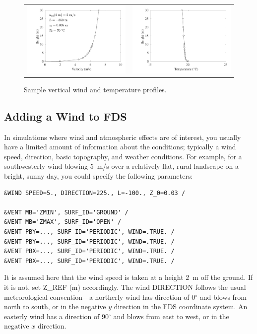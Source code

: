 \documentclass[11pt]{book}
\begin{document}
\begin{figure}[p]
\begin{tabular*}{\textwidth}{l@{\extracolsep{\fill}}r}
      \includegraphics[width=3.2in]{FIGURES/vel_L=-350}  &
      \includegraphics[width=3.2in]{FIGURES/tmp_L=-350}
   \end{tabular*}
   \caption[Sample vertical wind and temperature profiles]{Sample vertical wind and temperature profiles.}
   \label{wind_profiles}
\end{figure}


\subsection{Adding a Wind to FDS}


In simulations where wind and atmospheric effects are of interest, you usually have a limited amount of information about the conditions; typically a wind speed, direction, basic topography, and weather conditions. For example, for a southwesterly wind blowing 5~m/s over a relatively flat, rural landscape on a bright, sunny day, you could specify the following parameters:
\begin{lstlisting}
&WIND SPEED=5., DIRECTION=225., L=-100., Z_0=0.03 /

&VENT MB='ZMIN', SURF_ID='GROUND' /
&VENT MB='ZMAX', SURF_ID='OPEN' /
&VENT PBY=..., SURF_ID='PERIODIC', WIND=.TRUE. /
&VENT PBY=..., SURF_ID='PERIODIC', WIND=.TRUE. /
&VENT PBX=..., SURF_ID='PERIODIC', WIND=.TRUE. /
&VENT PBX=..., SURF_ID='PERIODIC', WIND=.TRUE. /
\end{lstlisting}
It is assumed here that the wind speed is taken at a height 2~m off the ground. If it is not, set {\ct Z\_REF} (m) accordingly. The wind {\ct DIRECTION} follows the usual meteorological convention---a northerly wind has direction of 0$^\circ$ and blows from north to south, or in the negative $y$ direction in the FDS coordinate system. An easterly wind has a direction of 90$^\circ$ and blows from east to west, or in the negative $x$ direction.
\end{document}
